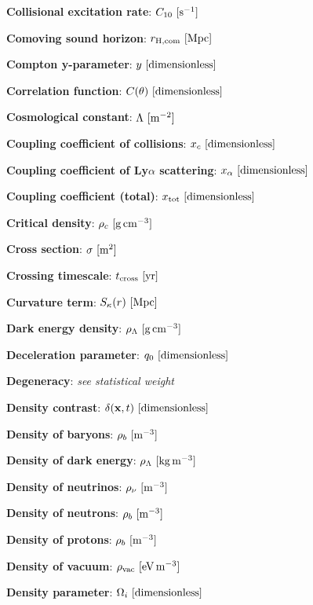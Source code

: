 \documentclass[a4paper,11pt]{article}
\begin{document}
{\noindent}\textbf{Collisional excitation rate}: $C_{10} ~ [{\rm s^{-1}}]$

{\noindent}\textbf{Comoving sound horizon}: $r_\mathrm{H,com} ~ [{\rm Mpc}]$

{\noindent}\textbf{Compton y-parameter}: $y ~ [{\rm dimensionless}]$

{\noindent}\textbf{Correlation function}: $C(\theta) ~ [{\rm dimensionless}]$

{\noindent}\textbf{Cosmological constant}: $\Lambda ~ [{\rm m^{-2}}]$

{\noindent}\textbf{Coupling coefficient of collisions}: $x_c ~ [{\rm dimensionless}]$

{\noindent}\textbf{Coupling coefficient of Ly$\alpha$ scattering}: $x_\alpha ~ [{\rm dimensionless}]$

{\noindent}\textbf{Coupling coefficient (total)}: $x_\mathrm{tot} ~ [{\rm dimensionless}]$

{\noindent}\textbf{Critical density}: $\rho_c ~ [{\rm g\,cm^{-3}}]$

{\noindent}\textbf{Cross section}: $\sigma ~ [{\rm m^{2}}]$

{\noindent}\textbf{Crossing timescale}: $t_\mathrm{cross} ~ [{\rm yr}]$

{\noindent}\textbf{Curvature term}: $S_\kappa(r) ~ [{\rm Mpc}]$

{\noindent}\textbf{Dark energy density}: $\rho_\Lambda ~ [{\rm g\,cm^{-3}}]$

{\noindent}\textbf{Deceleration parameter}: $q_0 ~ [{\rm dimensionless}]$

{\noindent}\textbf{Degeneracy}: \textit{see statistical weight}

{\noindent}\textbf{Density contrast}: $\delta(\mathbf{x},t) ~ [{\rm dimensionless}]$

{\noindent}\textbf{Density of baryons}: $\rho_b ~ [{\rm m^{-3}}]$

{\noindent}\textbf{Density of dark energy}: $\rho_\Lambda ~ [{\rm kg\,m^{-3}}]$

{\noindent}\textbf{Density of neutrinos}: $\rho_\nu ~ [{\rm m^{-3}}]$

{\noindent}\textbf{Density of neutrons}: $\rho_b ~ [{\rm m^{-3}}]$

{\noindent}\textbf{Density of protons}: $\rho_b ~ [{\rm m^{-3}}]$

{\noindent}\textbf{Density of vacuum}: $\rho_\mathrm{vac} ~ [{\rm eV\,m^{-3}}]$

{\noindent}\textbf{Density parameter}: $\Omega_i ~ [{\rm dimensionless}]$
\end{document}
